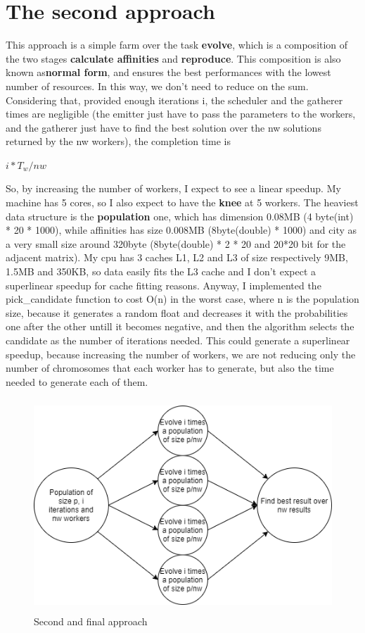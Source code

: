 \documentclass{article}
\begin{document}
    \section{The second approach}\label{sec:s3}
	This approach is a simple farm over the task \textbf{evolve}, which is a composition of the two stages \textbf{calculate affinities} and \textbf{reproduce}. This composition is also known as\textbf{normal form}, and ensures the best performances with the lowest number of resources. In this way, we don't need to reduce on the sum.
Considering that, provided enough iterations i, the scheduler and the gatherer times are negligible (the emitter just have to pass the parameters to the workers, and the gatherer just have to find the best solution over the nw solutions returned by the nw workers), the completion time is

	\centerline{$i*T_{w}/nw$}

    So, by increasing the number of workers, I expect to see a linear speedup. My machine has 5 cores, so I also expect to have the \textbf{knee} at 5 workers. The heaviest data structure is the \textbf{population} one, which has dimension 0.08MB (4 byte(int) * 20 * 1000), while affinities has size 0.008MB (8byte(double) * 1000) and city as a very small size around 320byte (8byte(double) * 2 * 20 and 20*20 bit for the adjacent matrix). My cpu has 3 caches L1, L2 and L3 of size respectively 9MB, 1.5MB and 350KB, so data easily fits the L3 cache and I don't expect a superlinear speedup for cache fitting reasons.
    Anyway, I implemented the pick\_candidate function to cost O(n) in the worst case, where n is the population size, because it generates a random float and decreases it with the probabilities one after the other untill it becomes negative, and then the algorithm selects the candidate as the number of iterations needed. This could generate a superlinear speedup, because increasing the number of workers, we are not reducing only the number of chromosomes that each worker has to generate, but also the time needed to generate each of them.

    \begin{figure}
        \includegraphics[width=\linewidth, height=8cm]{img/second.png}
        \caption{Second and final approach}
        \label{fig:second}
    \end{figure}
\end{document}
